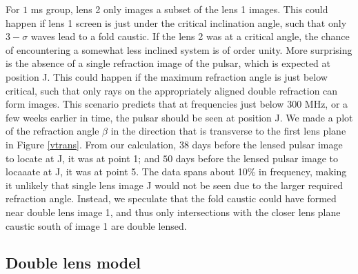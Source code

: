 \documentclass[useAMS,usenatbib]{mn2e}
\begin{document}
For $1$ ms group, lens 2
only images a subset of the lens 1 images.  This could happen if
lens 1 screen is just under the critical inclination
angle, such that only $3-\sigma$ waves lead to a fold caustic.  If the lens 2 was at a critical angle, the chance of encountering a
somewhat less inclined system is of order unity.
More surprising is the absence of a single refraction
image of the pulsar, which is expected at position J.  This could
happen if the maximum refraction angle is just below critical, such
that only rays on the appropriately aligned double refraction can form
images.  This scenario predicts that at frequencies just below $300$
MHz, or a few weeks earlier in time, the pulsar should be seen at
position J. We made a plot of the refraction angle $\beta$ in the
direction that is transverse to the first lens plane in Figure
\ref{vtrans}.  From our calculation, $38$ days before the lensed pulsar
 image to locate at J, it was at point 1; and $50$ days before the lensed pulsar image to locaaate at J, it was at point 5.  The data
spans about 10\% in frequency, making it unlikely that single lens
image J would not be seen due to the larger required refraction
angle.  Instead, we speculate that the fold caustic could have formed
near double lens image 1, and thus only intersections with the closer
lens plane caustic south of image 1 are double lensed.

\subsection{Double lens model}
\label{doublelensmodel}
\end{document}

